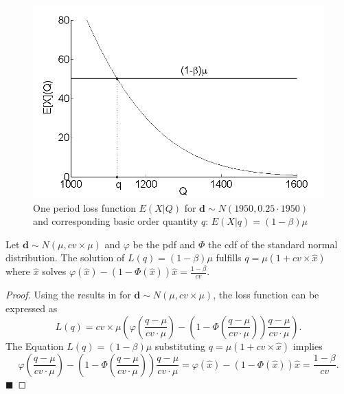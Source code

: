 \begin{figure}[!bt]
\centering
\includegraphics[scale=0.3]{iccsa2015/figures/lossfunFig.png}
\caption{One period loss function $E(X|Q)$ for $\boldsymbol d \sim N(1950,0.25\cdot1950)$ and corresponding basic order quantity $q$: $E(X|q)=(1-\beta)\mu$}
\label{fig:lossfunFig}
\end{figure}
%
\begin{lemma}
\label{lem:q1}
Let $\boldsymbol{d}\sim N(\mu,cv\times \mu)$ and $\varphi$ be the pdf and $\Phi$ the cdf of the standard normal distribution. The solution of  $L(q) = (1-\beta) \mu$ fulfills $q=\mu(1+cv\times\hat x)$ where $\hat x$ solves
$\varphi\left(\hat x\right)-\left(1-\Phi\left(\hat x\right)\right)\hat x =\frac{1-\beta}{cv}$.
\end{lemma}
%
\begin{proof}
Using the results in \cite{Rossi14} for $\boldsymbol{d}\sim N(\mu,cv\times\mu)$,  the loss function can be expressed as
%
\begin{equation}
\label{eq:rossi}
L(q)=cv\times\mu \left(\varphi\left(\frac{q-\mu}{cv\cdot\mu}\right)-\left(1-\Phi\left(\frac{q-\mu}{cv\cdot\mu}\right)\right)\frac{q-\mu}{cv\cdot\mu}\right) .
 \end{equation}
The Equation $L(q)=(1-\beta)\mu$ substituting $q=\mu(1+cv\times\hat x)$ implies
%
\begin{equation}
\label{eq:rossi2}
 \varphi\left(\frac{q-\mu}{cv\cdot \mu}\right)-\left(1-\Phi\left(\frac{q-\mu}{cv\cdot \mu}\right)\right)\frac{q-\mu}{cv\cdot \mu} =
\varphi(\hat x)-(1-\Phi(\hat x))\hat x =
 \frac{1-\beta}{cv} .
 \end{equation}
$\blacksquare$
\end{proof}
